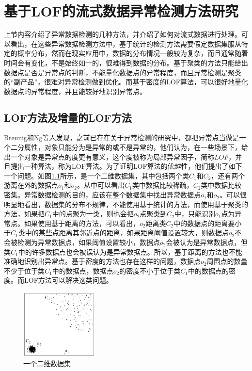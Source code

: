 \chapter{基于LOF的流式数据异常检测方法研究}
\label{chap:intro}
上节内容介绍了异常数据检测的几种方法，并介绍了如何对流式数据进行处理。可以看出，在这些异常数据检测方法中，基于统计的检测方法需要假定数据集服从特定的概率分布，然而在现实应用中，数据的分布情况一般较为复杂，而且通常随着时间会有变化，不是始终如一的，很难得到数据的分布。基于聚类的方法只能给出数据点是否是异常点的判断，不能量化数据点的异常程度，而且异常检测是聚类的“副产品”，很难对异常检测做到优化。而基于密度的LOF算法，可以很好地量化数据点的异常程度，并且能较好地识别异常点。

\section{LOF方法及增量的LOF方法}
Breunig和Ng等人发现，之前已存在关于异常检测的研究中，都把异常点当做是一个二分属性，对象只能分为是异常的或不是异常的，他们认为，在一些场景下，给出一个对象是异常点的度更有意义，这个度被称为局部异常因子，简称$LOF$，并且提出一种算法，称为LOF算法。为了证明LOF算法的优越性，他们提出了如下一个问题。如图\ref{fig:fig32}所示，是一个二维数据集，其中包括两个类$C_1$和$C_2$，还有两个游离在外的数据点$o_1$和$o_2$。从中可以看出$C_1$类中数据比较稀疏，$C_2$类中数据比较密集。异常数据检测的目的，应该在整个数据集中找出异常数据点$o_1$和$o_2$。可以很明显地看出，数据集的分布不规律，不能使用基于统计的方法，而使用基于聚类的方法，如果把$C_1$中的点聚为一类，则也会把$o_2$点聚类到$C_2$中，只能识别$o_1$点为异常点。如果使用基于距离的方法，可以看出，$o_2$距离类$C_2$中的数据点的距离要小于$C_1$类中的某些点距离其邻近点的距离，如果距离阈值设置较大，则数据点$o_2$不会被检测为异常数据点，如果阈值设置较小，数据点$o_2$会被认为是异常数据点，但类$C_1$中的许多数据点也会被误认为是异常数据点。所以，基于距离的方法也不能准确地识别出异常点。基于密度的方法也存在这样的问题，数据点$o_2$周围点的数量不少于位于类$C_1$中的数据点，数据点$o_2$的密度不小于位于类$C_1$中的数据点的密度。而LOF方法可以解决这类问题。

\begin{figure}
	\centering
	\includegraphics[width=0.35\textwidth]{figures/figure3x2}
	\caption{一个二维数据集}\label{fig:fig32}
\end{figure}

